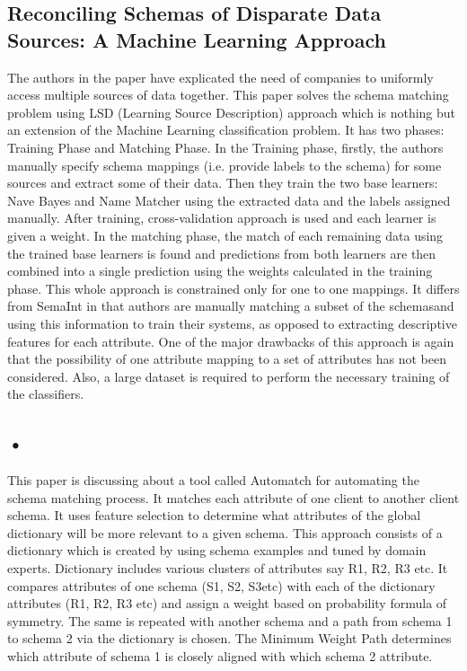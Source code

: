 \documentclass[conference]{IEEEtran}
\begin{document}
\subsection{\textbf{Reconciling Schemas of Disparate Data Sources: A Machine Learning Approach}\cite{ref2}}
The authors in the paper have explicated the need of companies to uniformly access multiple sources of data together. This paper solves the schema matching problem using
LSD (Learning Source Description) approach which is nothing but an extension of the Machine Learning
classification problem. It has two phases: Training Phase and Matching Phase. In the Training phase,
firstly, the authors manually specify schema mappings (i.e. provide labels to the schema) for some sources
and extract some of their data. Then they train the two base learners: Nave Bayes and Name Matcher
using the extracted data and the labels assigned manually. After training, cross-validation approach is
used and each learner is given a weight. In the matching phase, the match of each remaining data using
the trained base learners is found and predictions from both learners are then combined into a single
prediction using the weights calculated in the training phase. This whole approach is constrained only
for one to one mappings. It differs from SemaInt in that authors are manually matching a subset of the
schemasand using this information to train their systems, as opposed to extracting descriptive features
for each attribute.
One of the major drawbacks of this approach is again that the possibility of one attribute mapping
to a set of attributes has not been considered. Also, a large dataset is required to perform the necessary
training of the classifiers.
\subsection{•}
This paper is discussing about a tool called Automatch for automating the schema matching process. It
matches each attribute of one client to another client schema. It uses feature selection to determine what
attributes of the global dictionary will be more relevant to a given schema. This approach consists of a
dictionary which is created by using schema examples and tuned by domain experts. Dictionary includes
various clusters of attributes say R1, R2, R3 etc. It compares attributes of one schema (S1, S2, S3etc)
with each of the dictionary attributes (R1, R2, R3 etc) and assign a weight based on probability formula
of symmetry. The same is repeated with another schema and a path from schema 1 to schema 2 via
the dictionary is chosen. The Minimum Weight Path determines which attribute of schema 1 is closely
aligned with which schema 2 attribute.
\end{document}

